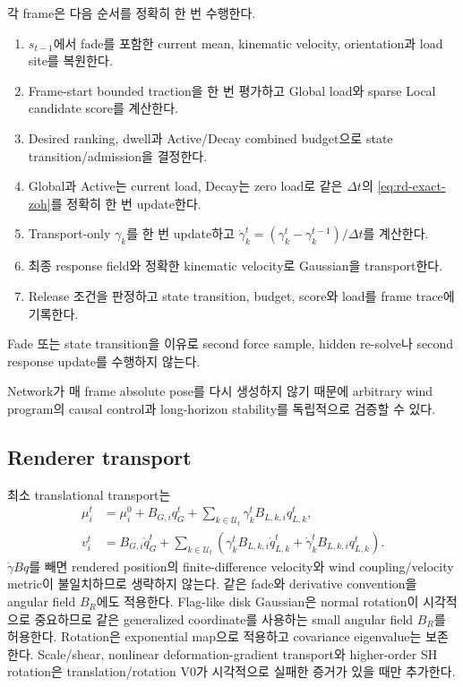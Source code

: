 \documentclass[11pt]{article}
\begin{document}
각 frame은 다음 순서를 정확히 한 번 수행한다.
\begin{enumerate}
  \item \(s_{t-1}\)에서 fade를 포함한 current mean, kinematic velocity, orientation과 load site를 복원한다.
  \item Frame-start bounded traction을 한 번 평가하고 Global load와 sparse Local candidate score를 계산한다.
  \item Desired ranking, dwell과 Active/Decay combined budget으로 state transition/admission을 결정한다.
  \item Global과 Active는 current load, Decay는 zero load로 같은 \(\Delta t\)의
  \eqref{eq:rd-exact-zoh}를 정확히 한 번 update한다.
  \item Transport-only \(\gamma_k\)를 한 번 update하고
  \(\dot\gamma_k^t=(\gamma_k^t-\gamma_k^{t-1})/\Delta t\)를 계산한다.
  \item 최종 response field와 정확한 kinematic velocity로 Gaussian을 transport한다.
  \item Release 조건을 판정하고 state transition, budget, score와 load를 frame trace에 기록한다.
\end{enumerate}
Fade 또는 state transition을 이유로 second force sample, hidden re-solve나 second response update를 수행하지 않는다.

Network가 매 frame absolute pose를 다시 생성하지 않기 때문에 arbitrary wind program의 causal control과
long-horizon stability를 독립적으로 검증할 수 있다.

\subsection{Renderer transport}

최소 translational transport는
\begin{equation}
  \begin{aligned}
  \mu_i^t&=\mu_i^0+B_{G,i}q_G^t+
  \sum_{k\in\mathcal U_t}\gamma_k^tB_{L,k,i}q_{L,k}^t,\\
  v_i^t&=B_{G,i}\dot q_G^t+
  \sum_{k\in\mathcal U_t}
  \left(\gamma_k^tB_{L,k,i}\dot q_{L,k}^t+
  \dot\gamma_k^tB_{L,k,i}q_{L,k}^t\right).
  \end{aligned}
  \label{eq:rd-mean-transport}
\end{equation}
\(\dot\gamma Bq\)를 빼면 rendered position의 finite-difference velocity와 wind coupling/velocity metric이
불일치하므로 생략하지 않는다. 같은 fade와 derivative convention을 angular field \(B_R\)에도 적용한다.
Flag-like disk Gaussian은 normal rotation이 시각적으로 중요하므로 같은 generalized coordinate를 사용하는
small angular field \(B_R\)를 허용한다. Rotation은 exponential map으로 적용하고 covariance eigenvalue는 보존한다.
Scale/shear, nonlinear deformation-gradient transport와 higher-order SH rotation은 translation/rotation V0가
시각적으로 실패한 증거가 있을 때만 추가한다.
\end{document}
